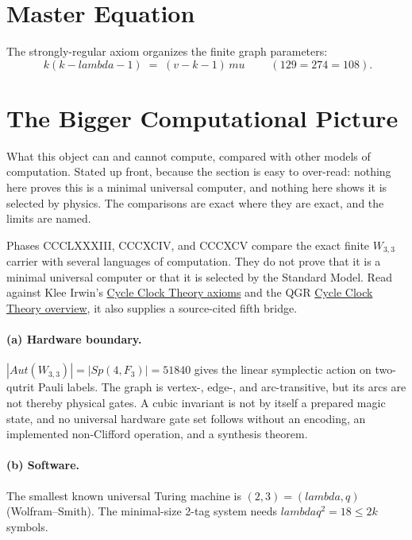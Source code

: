 \documentclass[12pt,a4paper]{article}
\def\mathbb#1{#1}%
\def\mathrm#1{#1}%
\def\lambda{lambda}%
\def\mu{mu}%
\def\cdot{ }%
\theoremstyle{definition}
\newcommand{\Sp}{\mathrm{Sp}}
\newcommand{\Aut}{\mathrm{Aut}}
\newcommand{\FF}{\mathbb{F}}
\begin{document}
\section{Master Equation}
The strongly-regular axiom organizes the finite graph parameters:
\[
\boxed{\;k(k-\lambda-1)\;=\;(v-k-1)\,\mu\;}\qquad
(12\cdot 9 = 27\cdot 4 = 108).
\]

\section{The Bigger Computational Picture}

\begin{plainbox}
What this object can and cannot compute, compared with other models of
computation. Stated up front, because the section is easy to over-read: nothing here
proves this is a minimal universal computer, and nothing here shows it is selected by
physics. The comparisons are exact where they are exact, and the limits are named.
\end{plainbox}

Phases CCCLXXXIII, CCCXCIV, and CCCXCV compare the exact finite
$W_{3,3}$ carrier with several languages of computation.  They do not
prove that it is a minimal universal computer or that it is selected by
the Standard Model.  Read against Klee Irwin's
\href{https://www.altpropulsion.com/wp-content/uploads/2025/01/Klee-Irwin-Clock-Cycle-Theory-Jan2025.pdf}{Cycle Clock Theory axioms}
and the QGR
\href{https://quantumgravityresearch.org/cycle-clock-theory-overview/}{Cycle Clock Theory overview},
it also supplies a source-cited fifth bridge.

\paragraph{(a) Hardware boundary.}
$|\Aut(W_{3,3})|=|\Sp(4,\FF_3)|=51840$ gives the linear symplectic
action on two-qutrit Pauli labels.  The graph is vertex-, edge-, and
arc-transitive, but its arcs are not thereby physical gates.  A cubic
invariant is not by itself a prepared magic state, and no universal
hardware gate set follows without an encoding, an implemented
non-Clifford operation, and a synthesis theorem.

\paragraph{(b) Software.}
The smallest known universal Turing machine is $(2,3)=(\lambda,q)$
(Wolfram--Smith). The minimal-size 2-tag system needs
$\lambda q^2 = 18 \le 2k$ symbols.
\end{document}
